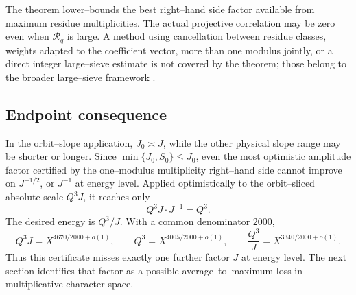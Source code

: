\begin{remark}
The theorem lower--bounds the best right--hand side factor available from
maximum residue multiplicities.  The actual projective correlation may
be zero even when \(\mathscr R_q\) is large.  A method using cancellation
between residue classes, weights adapted to the coefficient vector, more
than one modulus jointly, or a direct integer large--sieve estimate is not
covered by the theorem; those belong to the broader large--sieve framework
\citep{Bombieri1965,IwaniecKowalski2004}.
\end{remark}

\subsection{Endpoint consequence}

In the orbit--slope application, \(J_0\asymp J\), while the other
physical slope range may be shorter or longer.  Since
\(\min\{J_0,S_0\}\le J_0\), even the most optimistic amplitude factor
certified by the one--modulus multiplicity right--hand side cannot improve
on \(J^{-1/2}\), or \(J^{-1}\) at energy level.  Applied optimistically to
the orbit--sliced absolute scale \(Q^3J\), it reaches only
\begin{equation}
 Q^3J\cdot J^{-1}=Q^3.
 \label{eq:tpc35-one-modulus-ledger}
\end{equation}
The desired energy is \(Q^3/J\).  With a common denominator \(2000\),
\begin{equation}
 Q^3J=X^{4670/2000+o(1)},\qquad
 Q^3=X^{4005/2000+o(1)},\qquad
 \frac{Q^3}{J}=X^{3340/2000+o(1)}.
 \label{eq:tpc35-projective-exponent-ledger}
\end{equation}
Thus this certificate misses exactly one further factor \(J\) at energy
level.  The next section identifies that factor as a possible
average--to--maximum loss in multiplicative character space.
